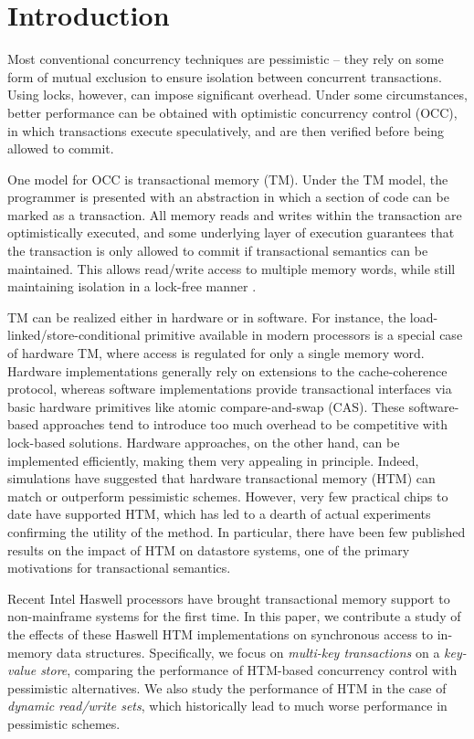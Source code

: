 \section{Introduction} \label{sec:intro}

Most conventional concurrency techniques are pessimistic -- they rely on some
form of mutual exclusion to ensure isolation between concurrent
transactions. Using locks, however, can impose significant overhead. Under some
circumstances, better performance can be obtained with optimistic concurrency
control (OCC), in which transactions execute speculatively, and are then
verified before being allowed to commit.

One model for OCC is transactional memory (TM). Under the TM model, the
programmer is presented with an abstraction in which a section of code can be
marked as a transaction. All memory reads and writes within the transaction are
optimistically executed, and some underlying layer of execution guarantees that
the transaction is only allowed to commit if transactional semantics can be
maintained. This allows read/write access to multiple memory words, while still
maintaining isolation in a lock-free manner \citep{Herlihy93}.

TM can be realized either in hardware or in software. For instance, the
load-linked/store-conditional primitive available in modern processors is a
special case of hardware TM, where access is regulated for only a single memory
word. Hardware implementations generally rely on extensions to the
cache-coherence protocol, whereas software implementations provide transactional
interfaces via basic hardware primitives like atomic compare-and-swap
(CAS). These software-based approaches tend to introduce too much overhead to be
competitive with lock-based solutions. Hardware approaches, on the other hand,
can be implemented efficiently, making them very appealing in principle. Indeed,
simulations have suggested that hardware transactional memory (HTM) can match or
outperform pessimistic schemes. However, very few practical chips to date have
supported HTM, which has led to a dearth of actual experiments confirming the
utility of the method. In particular, there have been few published results on
the impact of HTM on datastore systems, one of the primary motivations for
transactional semantics.

Recent Intel Haswell processors have brought transactional memory support to
non-mainframe systems for the first time. In this paper, we contribute a study
of the effects of these Haswell HTM implementations on synchronous access to
in-memory data structures. Specifically, we focus on \textit{multi-key
  transactions} on a \textit{key-value store}, comparing the performance of
HTM-based concurrency control with pessimistic alternatives. We also study the
performance of HTM in the case of \textit{dynamic read/write sets}, which
historically lead to much worse performance in pessimistic schemes.

